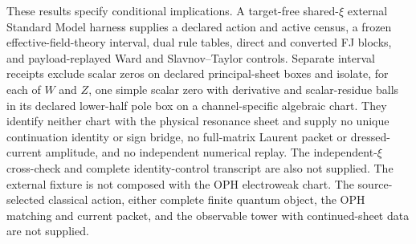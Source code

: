 \begin{remark}
These results specify conditional implications. A target-free
shared-\(\xi\) external Standard Model harness supplies a declared action and
active census, a frozen effective-field-theory interval, dual rule tables,
direct and converted FJ blocks, and payload-replayed Ward and
Slavnov--Taylor controls. Separate interval receipts exclude scalar zeros on
declared principal-sheet boxes and isolate, for each of \(W\) and \(Z\), one
simple scalar zero with derivative and scalar-residue balls in its declared
lower-half pole box on a channel-specific algebraic chart. They identify
neither chart with the physical resonance sheet and supply no unique
continuation identity or sign bridge, no full-matrix Laurent packet or
dressed-current amplitude, and no independent numerical replay. The
independent-\(\xi\) cross-check and complete identity-control transcript are
also not supplied. The external fixture is not composed with the OPH
electroweak chart. The source-selected classical action, either complete
finite quantum object, the OPH matching and current packet, and the observable
tower with continued-sheet data are not supplied.
\end{remark}
